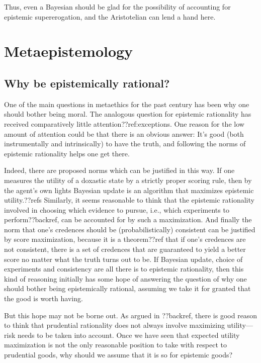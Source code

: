 Thus, even a Bayesian should be glad for the possibility of accounting for epistemic supererogation, and
the Aristotelian can lend a hand here.

\section{Metaepistemology}
\subsection{Why be epistemically rational?}
One of the main questions in metaethics for the past century has been why one should bother being moral. The analogous
question for epistemic rationality has received comparatively little attention??ref:exceptions.
One reason for the low amount of attention could be that there is an obvious answer: It's good 
(both instrumentally and intrinsically) to have the truth, and following the norms of epistemic rationality 
helps one get there.

Indeed, there are proposed norms which can be justified in this way. If one measures the utility of a 
doxastic state by a strictly proper scoring rule, then by the agent's own lights Bayesian update is 
an algorithm that maximizes epistemic utility.??refs Similarly, it seems reasonable to think that the
epistemic rationality involved in choosing which evidence to pursue, i.e., which experiments to perform??backref, 
can be accounted for by such a maximization. And finally the norm that one's credences should be 
(probabilistically) consistent can be justified by score maximization, because it is a theorem??ref
that if one's credences are not consistent, there is a set of credences that are guaranteed to yield 
a better score no matter what the truth turns out to be. If Bayesian update, choice of experiments and consistency
are all there is to  epistemic rationality, then this kind of 
reasoning initially has some hope of answering the question 
of why one should bother being epistemically rational, assuming we take it for granted that the good is worth
having. 

But this hope may not be borne out. As argued in ??backref, there is good reason to think that prudential 
rationality does not always involve maximizing utility---risk needs to be taken into account. Once we have
seen that expected utility maximization is not the only reasonable position to take with respect to prudential
goods, why should we assume that it is so for epistemic goods?


